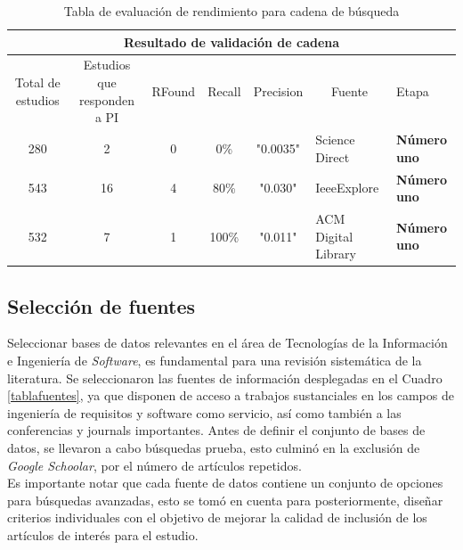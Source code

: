 \documentclass[conference,onecolumn,10pt]{IEEEtran}
\begin{document}
\begin{table}[!htbp]
\begin{center}
        \caption{Tabla de evaluación de rendimiento para cadena de búsqueda}
        \label{tab:my-table}
        \begin{tabular}{|c|c|c|c|c|l|l|}
                \hline
                \multicolumn{7}{|c|}{Resultado de validación de cadena}                                                                                \\ \hline
                Total de estudios & Estudios que responden a PI & RFound & Recall & Precision & \multicolumn{1}{c}{Fuente} & Etapa                     \\ \hline
                280               & 2                           & 0      & 0\%    & "0.0035"  & Science Direct             & \textbf{Número uno}       \\ \hline
                543               & 16                          & 4      & 80\%   & "0.030"   & IeeeExplore                & \textbf{Número uno}       \\ \hline
                532               & 7                           & 1      & 100\%  & "0.011"   & ACM Digital Library        & \textbf{Número uno}       \\ \hline
        \end{tabular}
\end{center}
\end{table}

\subsection{Selección de fuentes}
Seleccionar bases de datos relevantes en el área de Tecnologías de la Información 
e Ingeniería de \emph{Software}, es fundamental para una revisión sistemática 
de la literatura.  Se seleccionaron las fuentes de información desplegadas en el Cuadro \ref{tablafuentes},
ya que disponen de acceso a trabajos sustanciales en los campos de ingeniería de requisitos y software como servicio, 
así como también a las conferencias y journals importantes. 
Antes de definir el conjunto de bases de datos, se llevaron a cabo 
búsquedas prueba, esto culminó en la exclusión  de \emph{Google Schoolar}, 
por el número de artículos repetidos.\\
Es importante notar que cada fuente de datos contiene un conjunto de opciones para búsquedas avanzadas, 
esto se tomó en cuenta para posteriormente, diseñar criterios individuales con el objetivo de mejorar la calidad de inclusión de los 
artículos de interés para el estudio.
\end{document}
